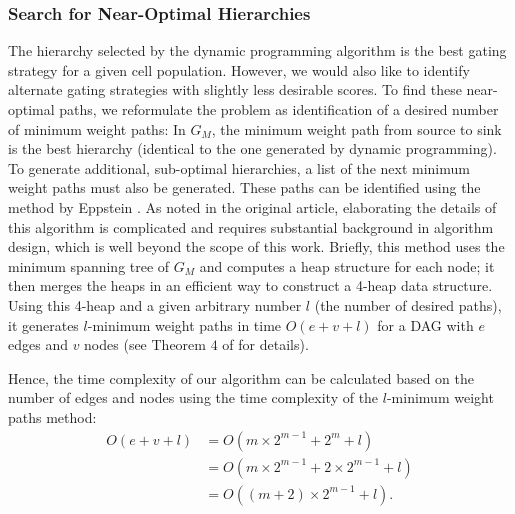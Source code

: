 \subsubsection{Search for Near-Optimal Hierarchies}
The hierarchy selected by the dynamic programming algorithm is the best gating strategy for a given cell population.
However, we would also like to identify alternate gating strategies with slightly less desirable scores.  
To find these near-optimal paths, we reformulate the problem as identification of a desired number of minimum weight paths: %
In $G_M$, the minimum weight path from source to sink is the best hierarchy (identical to the one generated by dynamic programming).  
To generate additional, sub-optimal hierarchies, a list of the next minimum weight paths must also be generated. 
These paths can be identified using the method by Eppstein  \cite{eppstein1998finding}.  
As noted in the original article, elaborating the details of this algorithm is complicated and requires substantial
background in algorithm design, which is well beyond the scope of this work.  Briefly, this method uses the minimum
spanning tree of $G_M$ and computes a heap structure for each node; it then merges the heaps in an efficient way to
construct a 4-heap data structure. Using this 4-heap and a given arbitrary number $l$ (the number of desired paths), it generates $l$-minimum weight paths in time $O(e + v + l)$ for a DAG with $e$ edges and $v$ nodes (see Theorem $4$ of \cite{eppstein1998finding} for details).


Hence, the time complexity of our algorithm can be calculated based on the number of
edges and nodes using the time complexity of the $l$-minimum weight paths method:
\begin{equation}
  \begin{split}
    O(e + v + l) & = O(m \times 2^{m-1} + 2^{m} + l)\\
    & = O(m \times 2^{m-1} + 2 \times 2^{m-1} + l)\\
    & = O((m+2) \times 2^{m-1} + l).\\
  \end{split}
  \label{order_equation}
\end{equation}

